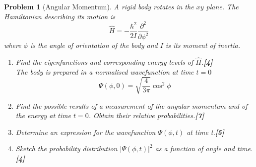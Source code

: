 \documentclass[a4paper]{article}
\theoremstyle{new}
\newtheorem{qns}{Problem}[subsection]
\begin{document}
\newpage
\begin{qns}[Angular Momentum]
A rigid body rotates in the $xy$ plane. The Hamiltonian describing its motion is 
$$\hat{H}=-\frac{\hbar^2}{2I}\frac{\partial^2}{\partial\phi^2}$$
where $\phi$ is the angle of orientation of the body and $I$ is its moment of inertia.
\begin{enumerate}[label=(\alph*)]
\item Find the eigenfunctions and corresponding energy levels of $\hat{H}$.\hfill\textbf{[4]}\\[5pt]
The body is prepared in a normalised wavefunction at time $t = 0$
$$\Psi(\phi,0)=\sqrt{\frac{4}{3\pi}}\cos^2\phi$$
\item Find the possible results of a measurement of the angular momentum and of the energy at time $t = 0$. Obtain their relative probabilities.\hfill\textbf{[7]}
\item Determine an expression for the wavefunction $\Psi(\phi,t)$ at time t.\hfill\textbf{[5]}
\item Sketch the probability distribution $|\Psi(\phi,t)|^2$ as a function of angle and time.\hfill\textbf{[4]}
\end{enumerate}
\end{qns}
\end{document}
